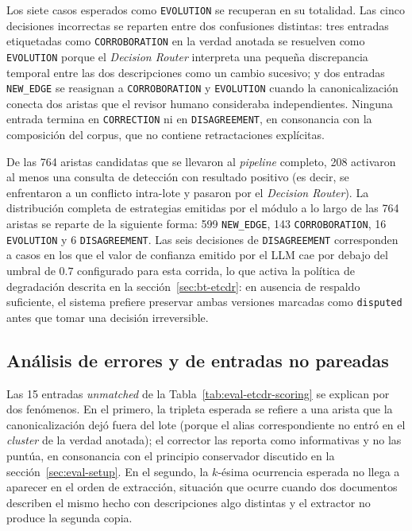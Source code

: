 Los siete casos esperados como \texttt{EVOLUTION} se recuperan en su totalidad. Las cinco decisiones incorrectas se reparten entre dos confusiones distintas: tres entradas etiquetadas como \texttt{CORROBORATION} en la verdad anotada se resuelven como \texttt{EVOLUTION} porque el \emph{Decision Router} interpreta una pequeña discrepancia temporal entre las dos descripciones como un cambio sucesivo; y dos entradas \texttt{NEW\_EDGE} se reasignan a \texttt{CORROBORATION} y \texttt{EVOLUTION} cuando la canonicalización conecta dos aristas que el revisor humano consideraba independientes. Ninguna entrada termina en \texttt{CORRECTION} ni en \texttt{DISAGREEMENT}, en consonancia con la composición del corpus, que no contiene retractaciones explícitas.

De las 764 aristas candidatas que se llevaron al \emph{pipeline} completo, 208 activaron al menos una consulta de detección con resultado positivo (es decir, se enfrentaron a un conflicto intra-lote y pasaron por el \emph{Decision Router}). La distribución completa de estrategias emitidas por el módulo a lo largo de las 764 aristas se reparte de la siguiente forma: 599 \texttt{NEW\_EDGE}, 143 \texttt{CORROBORATION}, 16 \texttt{EVOLUTION} y 6 \texttt{DISAGREEMENT}. Las seis decisiones de \texttt{DISAGREEMENT} corresponden a casos en los que el valor de confianza emitido por el LLM cae por debajo del umbral de $0.7$ configurado para esta corrida, lo que activa la política de degradación descrita en la sección~\ref{sec:bt-etcdr}: en ausencia de respaldo suficiente, el sistema prefiere preservar ambas versiones marcadas como \texttt{disputed} antes que tomar una decisión irreversible.

\subsection{Análisis de errores y de entradas no pareadas}

Las 15 entradas \emph{unmatched} de la Tabla~\ref{tab:eval-etcdr-scoring} se explican por dos fenómenos. En el primero, la tripleta esperada se refiere a una arista que la canonicalización dejó fuera del lote (porque el alias correspondiente no entró en el \emph{cluster} de la verdad anotada); el corrector las reporta como informativas y no las puntúa, en consonancia con el principio conservador discutido en la sección~\ref{sec:eval-setup}. En el segundo, la $k$-ésima ocurrencia esperada no llega a aparecer en el orden de extracción, situación que ocurre cuando dos documentos describen el mismo hecho con descripciones algo distintas y el extractor no produce la segunda copia.

